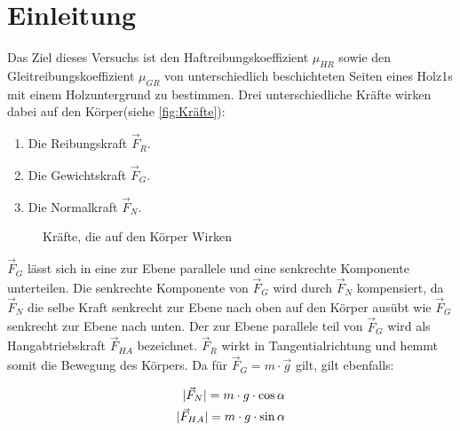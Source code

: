 \section{Einleitung}

Das Ziel dieses Versuchs ist den Haftreibungskoeffizient $\mu_{HR}$ sowie den Gleitreibungskoeffizient $\mu_{GR}$ von unterschiedlich beschichteten Seiten eines Holz1s mit einem Holzuntergrund zu bestimmen.
\newline
Drei unterschiedliche Kräfte wirken dabei auf den Körper(siehe \autoref{fig:Kräfte}):
\begin{enumerate}
    \item Die Reibungskraft $\vec{F}_R$.
    \item Die Gewichtskraft $\vec{F}_G$.
    \item Die Normalkraft $\vec{F}_N$.
\end{enumerate}


\usetikzlibrary{angles,quotes}
\begin{figure}
    \centering 
    
    \caption[Kräfte]{Kräfte, die auf den Körper Wirken}
    \label{fig:Kräfte}
\end{figure}

$\vec{F}_G$ lässt sich in eine zur Ebene parallele und eine senkrechte Komponente unterteilen. Die senkrechte Komponente von $\vec{F}_G$ wird durch $\vec{F}_N$ kompensiert, da $\vec{F}_N$ die selbe Kraft senkrecht zur Ebene nach oben auf den Körper ausübt wie $\vec{F}_G$ senkrecht zur Ebene nach unten. Der zur Ebene parallele teil von $\vec{F}_G$ wird als Hangabtriebskraft $\vec{F}_{HA}$ bezeichnet. $\vec{F}_R$ wirkt in Tangentialrichtung und hemmt somit die Bewegung des Körpers.\newline
Da für $\vec{F}_{G} = m \cdot \vec{g}$ gilt, gilt ebenfalls:

\begin{align}
    \lvert\vec{F}_{N}\rvert = m \cdot g \cdot \cos{\alpha} \label{F_N} \\
    \lvert\vec{F}_{HA}\rvert = m \cdot g \cdot \sin{\alpha} \label{F_HA}
\end{align}

